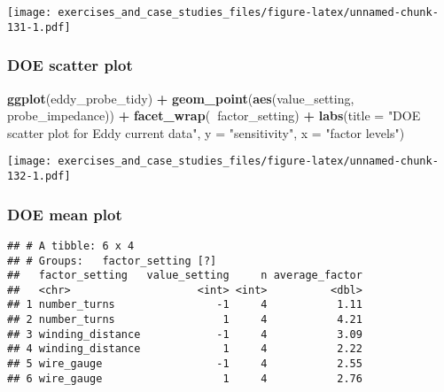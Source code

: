 \documentclass[]{book}
\newenvironment{Shaded}{\begin{snugshade}}{\end{snugshade}}
\newcommand{\DataTypeTok}[1]{\textcolor[rgb]{0.13,0.29,0.53}{#1}}
\newcommand{\KeywordTok}[1]{\textcolor[rgb]{0.13,0.29,0.53}{\textbf{#1}}}
\newcommand{\NormalTok}[1]{#1}
\newcommand{\OperatorTok}[1]{\textcolor[rgb]{0.81,0.36,0.00}{\textbf{#1}}}
\newcommand{\StringTok}[1]{\textcolor[rgb]{0.31,0.60,0.02}{#1}}
\theoremstyle{definition}
\theoremstyle{definition}
\theoremstyle{definition}
\theoremstyle{remark}
\begin{document}
\texttt{[image: exercises\_and\_case\_studies\_files/figure-latex/unnamed-chunk-131-1.pdf]}

\hypertarget{doe-scatter-plot}{%
\subsubsection{DOE scatter plot}\label{doe-scatter-plot}}

\begin{Shaded}
\begin{Highlighting}[]
\KeywordTok{ggplot}\NormalTok{(eddy_probe_tidy) }\OperatorTok{+}
\StringTok{  }\KeywordTok{geom_point}\NormalTok{(}\KeywordTok{aes}\NormalTok{(value_setting, probe_impedance)) }\OperatorTok{+}
\StringTok{  }\KeywordTok{facet_wrap}\NormalTok{(}\OperatorTok{~}\NormalTok{factor_setting) }\OperatorTok{+}
\StringTok{  }\KeywordTok{labs}\NormalTok{(}\DataTypeTok{title =} \StringTok{"DOE scatter plot for Eddy current data"}\NormalTok{, }\DataTypeTok{y =} \StringTok{"sensitivity"}\NormalTok{, }\DataTypeTok{x =} \StringTok{"factor levels"}\NormalTok{)}
\end{Highlighting}
\end{Shaded}

\texttt{[image: exercises\_and\_case\_studies\_files/figure-latex/unnamed-chunk-132-1.pdf]}

\hypertarget{doe-mean-plot}{%
\subsubsection{DOE mean plot}\label{doe-mean-plot}}

\begin{Shaded}
\end{Shaded}

\begin{verbatim}
## # A tibble: 6 x 4
## # Groups:   factor_setting [?]
##   factor_setting   value_setting     n average_factor
##   <chr>                    <int> <int>          <dbl>
## 1 number_turns                -1     4           1.11
## 2 number_turns                 1     4           4.21
## 3 winding_distance            -1     4           3.09
## 4 winding_distance             1     4           2.22
## 5 wire_gauge                  -1     4           2.55
## 6 wire_gauge                   1     4           2.76
\end{verbatim}
\end{document}
